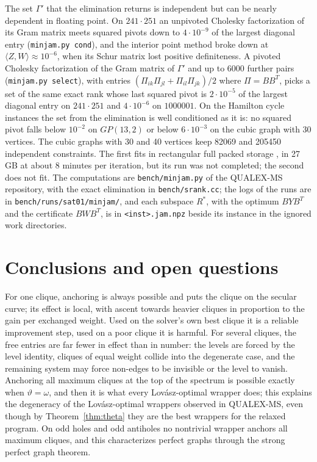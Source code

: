 \documentclass[11pt]{article}
\theoremstyle{definition}
\theoremstyle{remark}
\begin{document}
The set $\Gamma'$ that the elimination returns is independent but can be
nearly dependent in floating point. On $241\cdot251$ an unpivoted Cholesky
factorization of its Gram matrix meets squared pivots down to
$4\cdot10^{-9}$ of the largest diagonal entry (\texttt{minjam.py cond}),
and the interior point method broke down at
$\langle Z,W\rangle\approx10^{-6}$, when its Schur matrix lost positive
definiteness. A pivoted Cholesky factorization of the Gram matrix of
$\Gamma'$ and up to 6000 further pairs (\texttt{minjam.py select}), with
entries $(\Pi_{ik}\Pi_{jl}+\Pi_{il}\Pi_{jk})/2$ where $\Pi=BB^T$, picks a
set of the same exact rank whose last squared pivot is $2\cdot10^{-5}$ of
the largest diagonal entry on $241\cdot251$ and $4\cdot10^{-6}$ on
$1000001$. On the Hamilton cycle instances the set from the elimination is
well conditioned as it is: no squared pivot falls below $10^{-2}$ on
$GP(13,2)$ or below $6\cdot10^{-3}$ on the cubic graph with 30 vertices. The
cubic graphs with 30 and 40 vertices keep 82069 and 205450 independent
constraints. The first fits in rectangular
full packed storage \cite{GWDL10}, in 27 GB at about 8 minutes per
iteration, but its run was not completed; the second does not fit. The
computations are \texttt{bench/minjam.py} of the QUALEX-MS repository, with
the exact elimination in \texttt{bench/srank.cc}; the logs of the runs are
in \texttt{bench/runs/sat01/minjam/}, and each subspace $R^*$, with the
optimum $BYB^T$ and the certificate $BWB^T$, is in \texttt{<inst>.jam.npz}
beside its instance in the ignored work directories.

\section{Conclusions and open questions}

For one clique, anchoring is always possible and puts the clique on the
secular curve; its effect is local, with ascent towards heavier cliques in
proportion to the gain per exchanged weight. Used on the solver's own best
clique it is a reliable improvement step, used on a poor clique it is
harmful. For several cliques, the free entries are far fewer in effect than
in number: the levels are forced by the level identity, cliques of equal
weight collide into the degenerate case, and the remaining system may force
non-edges to be invisible or the level to vanish. Anchoring all maximum
cliques at the top of the spectrum is possible exactly when
$\vartheta=\omega$, and then it is what every Lov\'asz-optimal wrapper does;
this explains the degeneracy of the Lov\'asz-optimal wrappers observed in
QUALEX-MS, even though by Theorem~\ref{thm:theta} they are the best
wrappers for the relaxed program. On odd holes and odd antiholes no
nontrivial wrapper anchors all maximum cliques, and this
characterizes perfect graphs through the strong perfect graph theorem.
\end{document}
